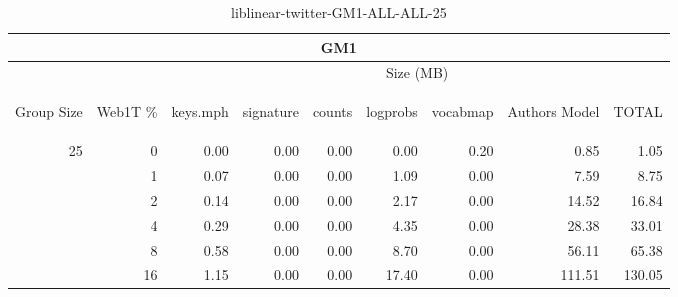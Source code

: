 \begin{center}
\begin{table}[htbp]
\begin{tabular}{ | r | r | r | r | r | r | r | r | r |}
\hline
\multicolumn{9}{|c|}{GM1}\\
\hline
 & & \multicolumn{7}{|c|}{Size (MB)}\\ \cline{3-9}
\begin{sideways}Group Size\end{sideways} & \begin{sideways}Web1T \% \end{sideways} & \begin{sideways}keys.mph\end{sideways} & \begin{sideways}signature\end{sideways} & \begin{sideways}counts\end{sideways} & \begin{sideways}logprobs\end{sideways} & \begin{sideways}vocabmap\end{sideways} & \begin{sideways}Authors Model \end{sideways} & \begin{sideways}TOTAL\end{sideways}\\
\hline
\multirow{5}{*}{25}
 & 0 & 0.00 & 0.00 & 0.00 & 0.00 & 0.20 & 0.85 & 1.05\\ \cline{2-9}
 & 1 & 0.07 & 0.00 & 0.00 & 1.09 & 0.00 & 7.59 & 8.75\\ \cline{2-9}
 & 2 & 0.14 & 0.00 & 0.00 & 2.17 & 0.00 & 14.52 & 16.84\\ \cline{2-9}
 & 4 & 0.29 & 0.00 & 0.00 & 4.35 & 0.00 & 28.38 & 33.01\\ \cline{2-9}
 & 8 & 0.58 & 0.00 & 0.00 & 8.70 & 0.00 & 56.11 & 65.38\\ \cline{2-9}
 & 16 & 1.15 & 0.00 & 0.00 & 17.40 & 0.00 & 111.51 & 130.05\\ \cline{2-9}
\hline
\end{tabular}
\caption{liblinear-twitter-GM1-ALL-ALL-25}
\label{table:liblinear-twitter-GM1-ALL-ALL-25}
\end{table}
\end{center}

